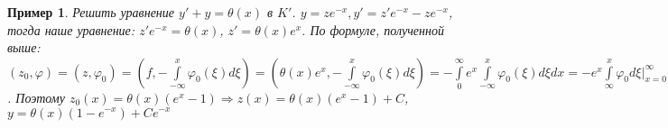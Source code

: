 \documentclass[9pt, a4paper]{article}
\newtheorem*{sample}{Пример}
\begin{document}
			\begin{sample}
				Решить уравнение $y'+y = \theta(x)$ в $K'$.\newline
				$y = z e^{-x}, y' = z'e^{-x} - z e^{-x}$, тогда наше уравнение: $z'e^{-x} = \theta(x)$, $z' = \theta(x) e^{x}$. По формуле, полученной выше: $(z_0, \varphi) = (z, \varphi_0) = (f, -\int\limits_{-\infty}^{x} \varphi_0(\xi) d\xi) = (\theta(x) e^x, - \int\limits_{-\infty}^{x} \varphi_0(\xi) d\xi) = -\int\limits_0^{\infty}e^x \int\limits_{-\infty}^{x} \varphi_0(\xi) d\xi dx = -e^x \int\limits_{\infty}^{x} \varphi_0 d\xi \vert_{x=0}^\infty + \int\limits_0^{\infty} e^x \varphi_0(x) dx = \{\varphi_0 \in K_0: \int\limits_{-\infty}^{\infty} \varphi_0 dx\xi = 0\} = \int\limits_{\infty}^{0} \varphi_0 d\xi + \int\limits_0^{\infty} e^x \varphi_0(x) dx = \int\limits_{-\infty}^{\infty} \varphi_0 d\xi + \int\limits_0^\infty (e^x - 1) \varphi_0 dx = \int\limits_{-\infty}^{\infty} \theta(x) (e^x - 1) \varphi_0(x) dx$. Поэтому $z_0(x) = \theta(x)(e^x -1) \Rightarrow z(x) = \theta(x) (e^x -1) + C$, $y = \theta(x) (1 - e^{-x}) + Ce^{-x}$
			\end{sample}
\end{document}
